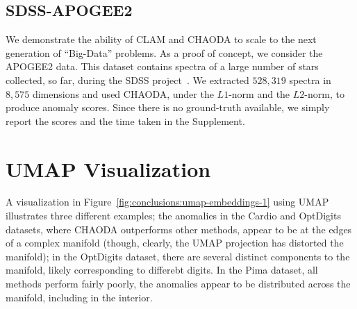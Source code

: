 \subsection{SDSS-APOGEE2}
\label{subsec:results:sdss-apogee2}

We demonstrate the ability of CLAM and CHAODA to scale to the next generation of ``Big-Data'' problems.
As a proof of concept, we consider the APOGEE2 data.
This dataset contains spectra of a large number of stars collected, so far, during the SDSS project~\cite{blanton2017sdss}.
We extracted $528,319$ spectra in $8,575$ dimensions and used CHAODA, under the $L1$-norm and the $L2$-norm, to produce anomaly scores.
Since there is no ground-truth available, we simply report the scores and the time taken in the Supplement.


\section{UMAP Visualization}
\label{sec:umap-visualization}

A visualization in Figure~\ref{fig:conclusions:umap-embeddings-1} using UMAP illustrates three different examples;
the anomalies in the Cardio and OptDigits datasets, where CHAODA outperforms other methods, appear to be at the edges of a complex manifold (though, clearly, the UMAP projection has distorted the manifold); in the OptDigits dataset, there are several distinct components to the manifold, likely corresponding to differebt digits.
In the Pima dataset, all methods perform fairly poorly, the anomalies appear to be distributed across the manifold, including in the interior.

